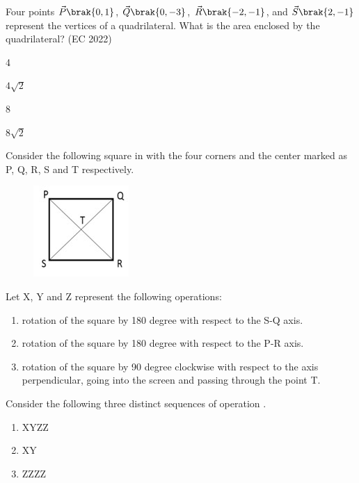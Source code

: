     \item Four points $\vec{P}\brak{0, 1}$, $\vec{Q}\brak{0, -3}$, $\vec{R}\brak{-2, -1}$, and $\vec{S}\brak{2, -1}$ represent the vertices of a quadrilateral.
    What is the area enclosed by the quadrilateral?
    \hfill{(EC 2022)}
    \begin{enumerate}
        \begin{multicols}{4}
        \item 4
        \item $4\sqrt{2}$
        \item 8
        \item $8\sqrt{2}$
        \end{multicols}
    \end{enumerate}
    \item Consider the following square in  with the four corners and the center marked as P, Q, R, S and T respectively.
    \begin{figure}[H]
        \centering
        \includegraphics[width=0.25\columnwidth]{GATE/2022/EC/figs/m3.jpg}
        \caption{}
        \label{fig:m3}
    \end{figure}
    Let X, Y and Z represent the following operations:
	    \begin{enumerate}[label=\Alph*:, start=24]
    
\item rotation of the square by 180 degree with respect to the S-Q axis.
\item rotation of the square by 180 degree with respect to the P-R axis.
\item rotation of the square by 90 degree clockwise with respect to the axis perpendicular, going into the screen and passing through the point T.
\end{enumerate}
    Consider the following three distinct sequences of operation .
    \begin{enumerate}[label=(\arabic*)]
        \item XYZZ
        \item XY
        \item ZZZZ
    \end{enumerate}
